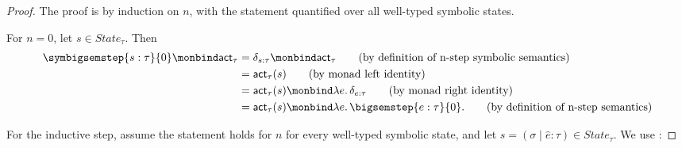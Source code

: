 \begin{proof}
  The proof is by induction on $n$, with the statement quantified over all
  well-typed symbolic states.

  For $n=0$, let $s \in State_\tau$. Then
  \begin{align}
    \symbigsemstep{s : \tau}{0}
    \monbind
    \mathsf{act}_\tau
    &=
    \delta_{s : \tau}
    \monbind
    \mathsf{act}_\tau
    \tag{\text{by definition of n-step symbolic semantics}} \\
    &=
    \mathsf{act}_\tau(s)
    \tag{\text{by monad left identity}} \\
    &=
    \mathsf{act}_\tau(s)
    \monbind
    \lambda e.\,\delta_{e : \tau}
    \tag{\text{by monad right identity}} \\
    &=
    \mathsf{act}_\tau(s)
    \monbind
    \lambda e.\,\bigsemstep{e : \tau}{0}.
    \tag{\text{by definition of n-step semantics}}
  \end{align}

  For the inductive step, assume the statement holds for $n$ for every
  well-typed symbolic state, and let
  $s = (\sigma \mid \hat e : \tau) \in State_\tau$. We use
  :


\end{proof}
